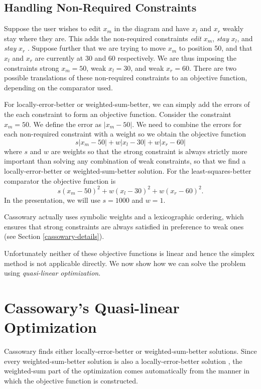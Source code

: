 \documentclass{article}
\newcommand{\strength}{\sf}
\begin{document}
\subsection{Handling Non-Required Constraints}
\label{non-requireds}

Suppose the user wishes to edit $x_m$ in the diagram and have $x_l$ and
$x_r$ weakly stay where they are.  This adds the non-required constraints
\emph{edit} $x_m$, \emph{stay} $x_l$, and \emph{stay} $x_r$ .  Suppose further
that we are trying to move $x_m$ to position 50, and that $x_l$ and $x_r$ are
currently at 30 and 60 respectively.  We are thus imposing the constraints
{\strength strong} $x_m = 50$, {\strength weak} $x_l = 30$, and 
{\strength weak} $x_r = 60$.
There are two possible translations of these non-required constraints
to an objective function, depending on the comparator used.

For locally-error-better or weighted-sum-better, we can
simply add the errors of the each constraint to form an objective function.
Consider the constraint $x_m = 50$.  We define the error as $|x_m-50|$\@.  We
need to combine the errors for each non-required constraint with a weight
so we obtain the objective function 
$$s |x_m - 50| + w |x_l - 30| + w |x_r - 60|$$
where $s$ and $w$ are weights so that the strong constraint is always
strictly more important than solving any combination of weak constraints,
so that we find a locally-error-better or weighted-sum-better solution.
For the least-squares-better comparator the objective function is 
$$s (x_m - 50)^2 + w (x_l - 30)^2 + w (x_r - 60)^2.$$  
In the presentation, we will use $s = 1000$ and $w = 1$.

Cassowary actually uses symbolic weights and a lexicographic ordering,
which ensures that strong constraints are always satisfied in preference to
weak ones (see Section \ref{cassowary-details}).

Unfortunately neither of these objective functions is linear and hence the
simplex method is not applicable directly.  We now show how we can 
solve the problem using \emph{quasi-linear optimization}.

\section{Cassowary's Quasi-linear Optimization}
\label{quasi-linear}

Cassowary finds either locally-error-better or weighted-sum-better
solutions.  Since every weighted-sum-better solution is also a
locally-error-better solution \cite{borning-lisp-symbolic-computation-92},
the weighted-sum part of the optimization comes automatically from the
manner in which the objective function is constructed.
\end{document}
